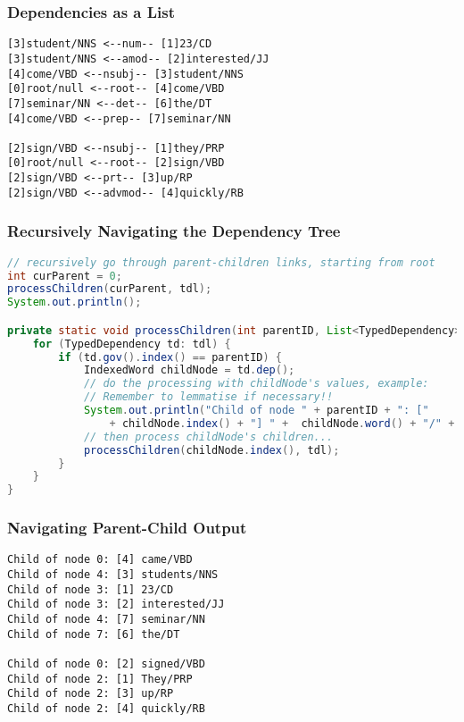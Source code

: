 \begin{frame}[fragile]
\frametitle{Dependencies as a List}
    
\begin{lstlisting}[basicstyle=\ttfamily\small]
[3]student/NNS <--num-- [1]23/CD
[3]student/NNS <--amod-- [2]interested/JJ
[4]come/VBD <--nsubj-- [3]student/NNS
[0]root/null <--root-- [4]come/VBD
[7]seminar/NN <--det-- [6]the/DT
[4]come/VBD <--prep-- [7]seminar/NN

[2]sign/VBD <--nsubj-- [1]they/PRP
[0]root/null <--root-- [2]sign/VBD
[2]sign/VBD <--prt-- [3]up/RP
[2]sign/VBD <--advmod-- [4]quickly/RB
\end{lstlisting}

\end{frame}


\begin{frame}[fragile]
\frametitle{Recursively Navigating the Dependency Tree}
    
\begin{lstlisting}[language=Java,basicstyle=\ttfamily\footnotesize]
// recursively go through parent-children links, starting from root
int curParent = 0;
processChildren(curParent, tdl);
System.out.println();

private static void processChildren(int parentID, List<TypedDependency> tdl) {
    for (TypedDependency td: tdl) {
        if (td.gov().index() == parentID) {
            IndexedWord childNode = td.dep();
            // do the processing with childNode's values, example:
            // Remember to lemmatise if necessary!!
            System.out.println("Child of node " + parentID + ": ["  
                + childNode.index() + "] " +  childNode.word() + "/" + childNode.tag());
            // then process childNode's children...
            processChildren(childNode.index(), tdl);
        }
    }   
}
\end{lstlisting}

\end{frame}


\begin{frame}[fragile]
\frametitle{Navigating Parent-Child Output}
    
\begin{lstlisting}
Child of node 0: [4] came/VBD
Child of node 4: [3] students/NNS
Child of node 3: [1] 23/CD
Child of node 3: [2] interested/JJ
Child of node 4: [7] seminar/NN
Child of node 7: [6] the/DT

Child of node 0: [2] signed/VBD
Child of node 2: [1] They/PRP
Child of node 2: [3] up/RP
Child of node 2: [4] quickly/RB
\end{lstlisting} 

\end{frame}


